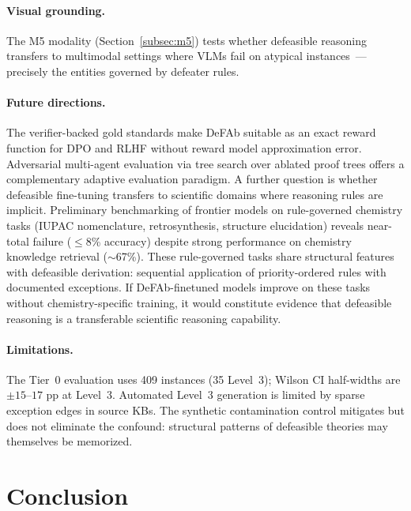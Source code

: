 \documentclass{article}
\theoremstyle{definition}
\begin{document}
\paragraph{Visual grounding.}
The M5 modality (Section~\ref{subsec:m5}) tests whether defeasible reasoning transfers to multimodal settings where VLMs fail on atypical instances~\cite{park2025visage}---precisely the entities governed by defeater rules.

\paragraph{Future directions.}
The verifier-backed gold standards make DeFAb suitable as an exact reward function for DPO and RLHF without reward model approximation error. Adversarial multi-agent evaluation via tree search over ablated proof trees offers a complementary adaptive evaluation paradigm. A further question is whether defeasible fine-tuning transfers to scientific domains where reasoning rules are implicit. Preliminary benchmarking of frontier models on rule-governed chemistry tasks (IUPAC nomenclature, retrosynthesis, structure elucidation) reveals near-total failure ($\leq$8\% accuracy) despite strong performance on chemistry knowledge retrieval ($\sim$67\%). These rule-governed tasks share structural features with defeasible derivation: sequential application of priority-ordered rules with documented exceptions. If DeFAb-finetuned models improve on these tasks without chemistry-specific training, it would constitute evidence that defeasible reasoning is a transferable scientific reasoning capability.

\paragraph{Limitations.}
The Tier~0 evaluation uses 409 instances (35 Level~3); Wilson CI half-widths are $\pm 15$--$17$ pp at Level~3. Automated Level~3 generation is limited by sparse exception edges in source KBs. The synthetic contamination control mitigates but does not eliminate the confound: structural patterns of defeasible theories may themselves be memorized.


\section{Conclusion}\label{sec:conclusion}
\end{document}
